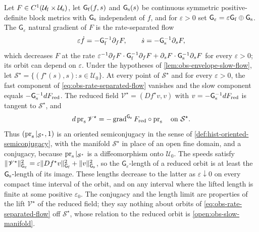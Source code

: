 Let $F\in C^1(\mathcal U_{\rm f}\times\mathcal U_{\rm s})$, let
$\mathsf G_{\rm f}(f,s)$ and $\mathsf G_{\rm s}(s)$ be continuous symmetric
positive-definite block metrics with $\mathsf G_{\rm s}$ independent of $f$, and
for $\varepsilon>0$ set
$\mathsf G_\varepsilon=\varepsilon\mathsf G_{\rm f}\oplus\mathsf G_{\rm s}$. The
$\mathsf G_\varepsilon$ natural gradient of $F$ is the rate-separated flow
\begin{equation}
\varepsilon\dot f=-\mathsf G_{\rm f}^{-1}\partial_fF,
\qquad
\dot s=-\mathsf G_{\rm s}^{-1}\partial_sF,
\label{eq:obs-rate-separated-flow}
\end{equation}
which decreases $F$ at the rate
$\varepsilon^{-1}\partial_fF\cdot\mathsf G_{\rm f}^{-1}\partial_fF
+\partial_sF\cdot\mathsf G_{\rm s}^{-1}\partial_sF$ for every $\varepsilon>0$; its
orbit can depend on $\varepsilon$. Under the hypotheses of
\cref{lem:obs-envelope-slow-flow}, let
$\mathcal S^\star=\{(f^\star(s),s):s\in\mathcal U_0\}$. At every point of
$\mathcal S^\star$ and for every $\varepsilon>0$, the fast component of
\eqref{eq:obs-rate-separated-flow} vanishes and the slow component equals
$-\mathsf G_{\rm s}^{-1}dF_{\rm red}$. The reduced field
$\mathscr V^\star=(Df^\star v,v)$ with $v=-\mathsf G_{\rm s}^{-1}dF_{\rm red}$ is
tangent to $\mathcal S^\star$, and
\begin{equation}
d\operatorname{pr}_{\rm s}\mathscr V^\star
=-\operatorname{grad}^{\mathsf G_{\rm s}}F_{\rm red}\circ\operatorname{pr}_{\rm s}
\quad\text{on }\mathcal S^\star.
\label{eq:obs-reduced-semiconjugacy}
\end{equation}
Thus $(\operatorname{pr}_{\rm s}|_{\mathcal S^\star},1)$ is an oriented
semiconjugacy in the sense of \cref{def:hist-oriented-semiconjugacy}, with the
manifold $\mathcal S^\star$ in place of an open fine domain, and a conjugacy,
because $\operatorname{pr}_{\rm s}|_{\mathcal S^\star}$ is a diffeomorphism onto
$\mathcal U_0$. The speeds satisfy
$\lVert\mathscr V^\star\rVert^2_{\mathsf G_\varepsilon}
=\varepsilon\lVert Df^\star v\rVert^2_{\mathsf G_{\rm f}}+\lVert v\rVert^2_{\mathsf G_{\rm s}}$,
so the $\mathsf G_\varepsilon$-length of a reduced orbit is at least the
$\mathsf G_{\rm s}$-length of its image. These lengths decrease to the latter as
$\varepsilon\downarrow0$ on every compact time interval of the orbit, and on
any interval where the lifted length is finite at some positive
$\varepsilon_0$. The conjugacy and the length limit are properties of the lift
$\mathscr V^\star$ of the reduced field; they say nothing about orbits of
\eqref{eq:obs-rate-separated-flow} off $\mathcal S^\star$, whose relation to the
reduced orbit is \cref{open:obs-slow-manifold}. 

